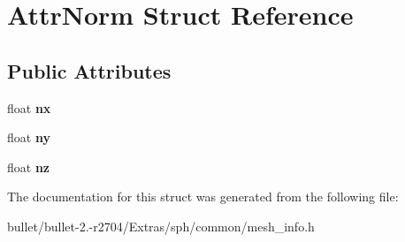 \hypertarget{struct_attr_norm}{\section{Attr\+Norm Struct Reference}
\label{struct_attr_norm}
}
\subsection*{Public Attributes}
\begin{DoxyCompactItemize}
\item 
\hypertarget{struct_attr_norm_aa13b969414442e7e74c568fa340a567c}{float {\bfseries nx}}\label{struct_attr_norm_aa13b969414442e7e74c568fa340a567c}

\item 
\hypertarget{struct_attr_norm_a08b50ef04675a85f8d255f737843f2c5}{float {\bfseries ny}}\label{struct_attr_norm_a08b50ef04675a85f8d255f737843f2c5}

\item 
\hypertarget{struct_attr_norm_a2dc1a85a869d02f5d4673c95d540c5bb}{float {\bfseries nz}}\label{struct_attr_norm_a2dc1a85a869d02f5d4673c95d540c5bb}

\end{DoxyCompactItemize}


The documentation for this struct was generated from the following file\+:\begin{DoxyCompactItemize}
\item 
bullet/bullet-\/2.-\/r2704/\+Extras/sph/common/mesh\+\_\+info.\+h\end{DoxyCompactItemize}
